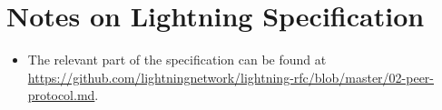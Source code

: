 \section{Notes on Lightning Specification}
\begin{itemize}
  \item The relevant part of the specification can be found at
  \url{https://github.com/lightningnetwork/lightning-rfc/blob/master/02-peer-protocol.md}.
\end{itemize}
